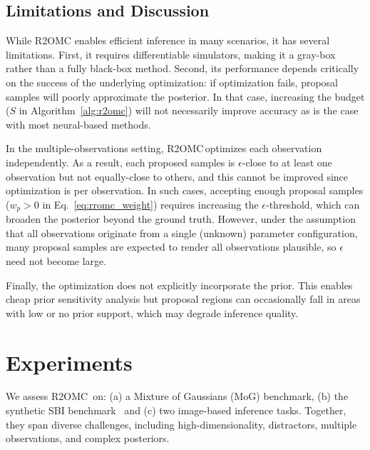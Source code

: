 \documentclass[twoside]{article}
\newcommand{\rromc}{R2OMC}
\begin{document}
\subsection{Limitations and Discussion}

While R2OMC enables efficient inference in many scenarios, it has several limitations.
First, it requires differentiable simulators, making it a gray-box rather than a fully black-box method. 
Second, its performance depends critically on the success of the underlying optimization: if optimization fails, proposal samples will poorly approximate the posterior.
In that case, increasing the budget ($S$ in Algorithm~\ref{alg:r2omc}) will not necessarily improve accuracy as is the case with most neural-based methods.

In the multiple-observations setting, \rromc \,optimizes each observation independently. 
As a result, each proposed samples is $\epsilon$-close to at least one observation but not equally-close to others, and this cannot be improved since optimization is per observation. 
In such cases, accepting enough proposal samples ($w_p > 0$ in Eq.~\eqref{eq:rromc_weight}) requires increasing the $\epsilon$-threshold, which can broaden the posterior beyond the ground truth. 
However, under the assumption that all observations originate from a single (unknown) parameter configuration, many proposal samples are expected to render all observations plausible, so $\epsilon$ need not become large.
 

Finally, the optimization does not explicitly incorporate the prior. This enables cheap prior sensitivity analysis but proposal regions can occasionally fall in areas with low or no prior support, which may degrade inference quality.


\section{Experiments}
\label{sec:experiments}

We assess \rromc~on: 
(a) a Mixture of Gaussians (MoG) benchmark, 
(b) the synthetic SBI benchmark~\citep{lueckmann2021benchmarking} and 
(c) two image-based inference tasks. 
Together, they span diverse challenges, including high-dimensionality, distractors, multiple observations, and complex posteriors.
\end{document}
